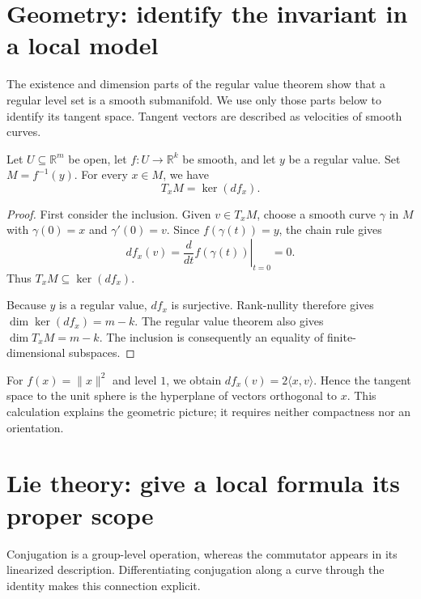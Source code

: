 \documentclass[11pt,a4paper]{article}
\begin{document}
\clearpage
\section{Geometry: identify the invariant in a local model}

The existence and dimension parts of the regular value theorem show that a regular level set is a smooth submanifold. We use only those parts below to identify its tangent space. Tangent vectors are described as velocities of smooth curves.

\begin{proposition}\label{thm:regular-level-tangent}

Let $U\subseteq\mathbb R^m$ be open, let $f\colon U\to\mathbb R^k$ be smooth, and let $y$ be a regular value. Set $M=f^{-1}(y)$. For every $x\in M$, we have
\[
T_xM=\ker(df_x).
\]

\end{proposition}

\begin{proof}

First consider the inclusion. Given $v\in T_xM$, choose a smooth curve $\gamma$ in $M$ with $\gamma(0)=x$ and $\gamma'(0)=v$. Since $f(\gamma(t))=y$, the chain rule gives
\[
df_x(v)=\left.\frac{d}{dt}f(\gamma(t))\right|_{t=0}=0.
\]
Thus $T_xM\subseteq\ker(df_x)$.

Because $y$ is a regular value, $df_x$ is surjective. Rank-nullity therefore gives $\dim\ker(df_x)=m-k$. The regular value theorem also gives $\dim T_xM=m-k$. The inclusion is consequently an equality of finite-dimensional subspaces.
\end{proof}

For $f(x)=\lVert x\rVert^2$ and level $1$, we obtain $df_x(v)=2\langle x,v\rangle$. Hence the tangent space to the unit sphere is the hyperplane of vectors orthogonal to $x$. This calculation explains the geometric picture; it requires neither compactness nor an orientation.



\clearpage
\section{Lie theory: give a local formula its proper scope}

Conjugation is a group-level operation, whereas the commutator appears in its linearized description. Differentiating conjugation along a curve through the identity makes this connection explicit.
\end{document}
